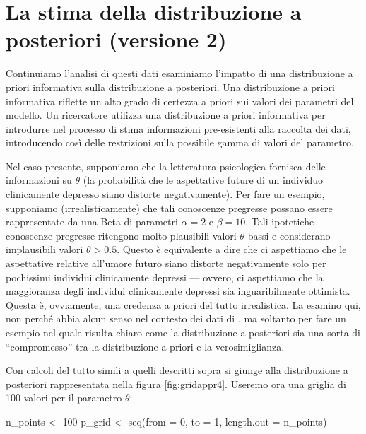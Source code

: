 \documentclass[
]{memoir}
\newenvironment{Shaded}{\begin{snugshade}}{\end{snugshade}}
\newcommand{\AttributeTok}[1]{\textcolor[rgb]{0.77,0.63,0.00}{#1}}
\newcommand{\DecValTok}[1]{\textcolor[rgb]{0.00,0.00,0.81}{#1}}
\newcommand{\FunctionTok}[1]{\textcolor[rgb]{0.00,0.00,0.00}{#1}}
\newcommand{\NormalTok}[1]{#1}
\newcommand{\OtherTok}[1]{\textcolor[rgb]{0.56,0.35,0.01}{#1}}
\begin{document}
\hypertarget{es-depression-beta-2-10}{%
\section{La stima della distribuzione a posteriori (versione 2)}\label{es-depression-beta-2-10}}

Continuiamo l'analisi di questi dati esaminiamo l'impatto di una distribuzione a priori informativa sulla distribuzione a posteriori. Una distribuzione a priori informativa riflette un alto grado di certezza a priori sui valori dei parametri del modello. Un ricercatore utilizza una distribuzione a priori informativa per introdurre nel processo di stima informazioni pre-esistenti alla raccolta dei dati, introducendo così delle restrizioni sulla possibile gamma di valori del parametro.

Nel caso presente, supponiamo che la letteratura psicologica fornisca delle informazioni su \(\theta\) (la probabilità che le aspettative future di un individuo clinicamente depresso siano distorte negativamente). Per fare un esempio, supponiamo (irrealisticamente) che tali conoscenze pregresse possano essere rappresentate da una Beta di parametri \(\alpha = 2\) e \(\beta = 10\). Tali ipotetiche conoscenze pregresse ritengono molto plausibili valori \(\theta\) bassi e considerano implausibili valori \(\theta > 0.5\). Questo è equivalente a dire che ci aspettiamo che le aspettative relative all'umore futuro siano distorte negativamente solo per pochissimi individui clinicamente depressi --- ovvero, ci aspettiamo che la maggioranza degli individui clinicamente depressi sia inguaribilmente ottimista. Questa è, ovviamente, una credenza a priori del tutto irrealistica. La esamino qui, non perché abbia alcun senso nel contesto dei dati di \citet{zetschefuture2019}, ma soltanto per fare un esempio nel quale risulta chiaro come la distribuzione a posteriori sia una sorta di ``compromesso'' tra la distribuzione a priori e la verosimiglianza.

Con calcoli del tutto simili a quelli descritti sopra si giunge alla distribuzione a posteriori rappresentata nella figura \ref{fig:gridappr4}. Useremo ora una griglia di 100 valori per il parametro \(\theta\):

\begin{Shaded}
\begin{Highlighting}[]
\NormalTok{n\_points }\OtherTok{\textless{}{-}} \DecValTok{100}
\NormalTok{p\_grid }\OtherTok{\textless{}{-}} \FunctionTok{seq}\NormalTok{(}\AttributeTok{from =} \DecValTok{0}\NormalTok{, }\AttributeTok{to =} \DecValTok{1}\NormalTok{, }\AttributeTok{length.out =}\NormalTok{ n\_points)}
\end{Highlighting}
\end{Shaded}
\end{document}
